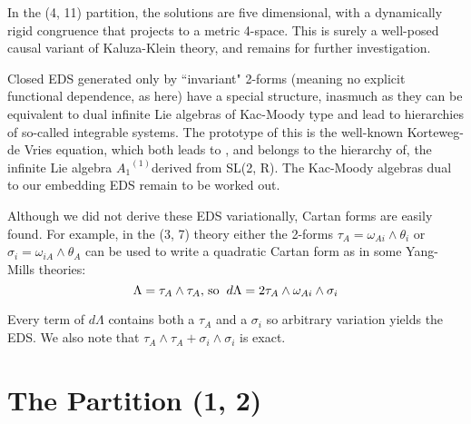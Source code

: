 \documentclass[a4paper,a4paper]{article}
\begin{document}
        In the (4,  11) partition,  the solutions are five dimensional,
with a dynamically rigid congruence that projects to a metric
4-space.  This is
surely a well-posed causal variant of Kaluza-Klein theory,  and remains
for further investigation.

        Closed EDS generated only by ``invariant" 2-forms  (meaning no
explicit functional dependence,  as here) have a special structure,
inasmuch as they
can be equivalent to dual infinite Lie algebras of Kac-Moody type and
lead to hierarchies of so-called integrable systems.  The prototype of
this is the well-known Korteweg-de Vries equation,  which both leads to
\cite{est90},  and belongs to the hierarchy of,  the infinite Lie
algebra \({{{A_1}}^{(1)}}\)derived from SL(2, R).   The Kac-Moody algebras 
dual to our embedding EDS remain to be worked out.

        Although we did not derive these EDS variationally,  Cartan
forms are easily found.  For example,  in the (3, 7) theory either the
2-forms \({{\tau }_{A }} = {{\omega }_{{Ai}}}\wedge {{\theta }_i}\) or \({{\sigma }_i} =
{{\omega }_{{iA}}}\wedge {{\theta }_{A }}\) can be used to write a quadratic 
Cartan form as in some Yang-Mills theories:
\begin{equation}
\Lambda  = {{\tau }_A}\wedge {{\tau }_A},
\hspace{0.05cm}\mbox{so}\hspace{0.2cm} d{\Lambda } =
2 {{\tau }_A}\wedge {{\omega }_{{Ai}}}\wedge {{\sigma }_i}
\end{equation}

Every term of $d\Lambda$  contains both a ${{\tau }_A}$ and a ${{\sigma }_i}$
so arbitrary variation yields the EDS.  We also note that
${{\tau }_A}\wedge {{\tau }_A} + {{\sigma }_i}\wedge {{\sigma
}_i}$ is exact.

\section{The Partition (1, 2)}
\end{document}
